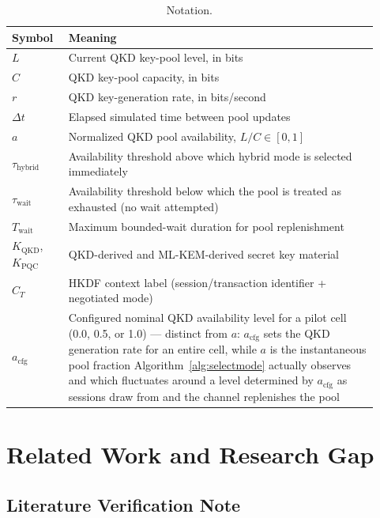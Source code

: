 \documentclass[journal]{IEEEtran}
\newcommand{\qkdavail}{\ensuremath{a}}
\newcommand{\acfg}{\ensuremath{a_{\text{cfg}}}}
\begin{document}
\begin{table}[t]
\centering
\caption{Notation.}
\label{tab:notation}
\small
\begin{tabular}{@{}p{0.14\linewidth}p{0.78\linewidth}@{}}
\toprule
Symbol & Meaning \\
\midrule
$L$ & Current QKD key-pool level, in bits \\
$C$ & QKD key-pool capacity, in bits \\
$r$ & QKD key-generation rate, in bits/second \\
$\Delta t$ & Elapsed simulated time between pool updates \\
$\qkdavail$ & Normalized QKD pool availability, $L/C \in [0,1]$ \\
$\tau_{\text{hybrid}}$ & Availability threshold above which hybrid mode is selected immediately \\
$\tau_{\text{wait}}$ & Availability threshold below which the pool is treated as exhausted (no wait attempted) \\
$T_{\text{wait}}$ & Maximum bounded-wait duration for pool replenishment \\
$K_{\text{QKD}}$, $K_{\text{PQC}}$ & QKD-derived and ML-KEM-derived secret key material \\
$C_T$ & HKDF context label (session/transaction identifier + negotiated mode) \\
$\acfg$ & Configured nominal QKD availability level for a pilot cell (0.0, 0.5, or 1.0) --- distinct from $\qkdavail$: $\acfg$ sets the QKD generation rate for an entire cell, while $\qkdavail$ is the instantaneous pool fraction Algorithm~\ref{alg:selectmode} actually observes and which fluctuates around a level determined by $\acfg$ as sessions draw from and the channel replenishes the pool \\
\bottomrule
\end{tabular}
\end{table}

\section{Related Work and Research Gap}
\label{sec:related}

\subsection{Literature Verification Note}
\end{document}
